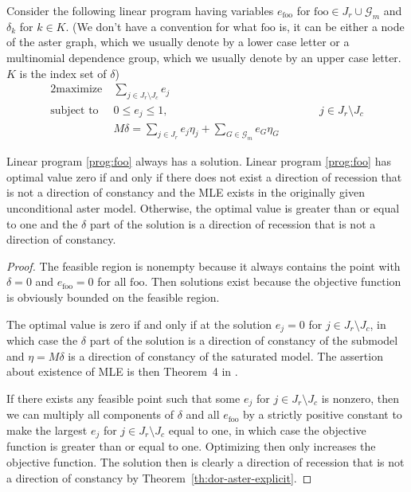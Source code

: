 Consider the following linear program having variables $e_\text{foo}$
for $\text{foo} \in J_r \cup \mathcal{G}_m$ and $\delta_k$ for $k \in K$.
(We don't have a convention for
what $\text{foo}$ is, it can be either a node of the aster graph, which
we usually denote by a lower case letter or a multinomial dependence group,
which we usually denote by an upper case letter.  $K$ is the index set of
$\delta$)
\begin{alignat}{2}
  \text{maximize}   & \ \sum_{j \in J_r \setminus J_c} e_j
  \nonumber
  \\
  \text{subject to} & \ 0 \le e_j \le 1, & \qquad & j \in J_r \setminus J_c
  \label{prog:foo}
  \\
                    & \ M \delta =
  \sum_{j \in J_r} e_j \eta_j + \sum_{G \in \mathcal{G}_m} e_G \eta_G
  \nonumber
\end{alignat}
\begin{theorem} \label{th:lin-prog-one}
Linear program \eqref{prog:foo} always has a solution.
Linear program \eqref{prog:foo} has optimal value zero if and only if
there does
not exist a direction of recession that is not a direction of constancy
and the MLE exists in the originally given unconditional aster model.
Otherwise, the optimal value is greater than or equal to one and the
$\delta$ part of the solution is a direction of recession that is not
a direction of constancy.
\end{theorem}
\begin{proof}
The feasible region is nonempty because it always contains the point with
$\delta = 0$ and $e_\text{foo} = 0$ for all $\text{foo}$.  Then solutions
exist because the objective function is obviously bounded on the feasible
region.

The optimal value is zero if and only if at the solution $e_j = 0$ for
$j \in J_r \setminus J_c$, in which case the $\delta$ part of the solution
is a direction of constancy of the submodel and $\eta = M \delta$ is a
direction of constancy of the saturated model.  The assertion about
existence of MLE is then Theorem~{4} in \citet{geyer-gdor}.

If there exists any feasible point such that some $e_j$
for $j \in J_r \setminus J_c$ is nonzero, then we can multiply all components
of $\delta$ and all $e_\text{foo}$ by a strictly positive constant to make
the largest $e_j$ for $j \in J_r \setminus J_c$ equal to one, in which case
the objective function is greater than or equal to one.
Optimizing then only increases the objective function.
The solution then is clearly a direction of recession that is not a
direction of constancy by Theorem~\ref{th:dor-aster-explicit}.
\end{proof}

